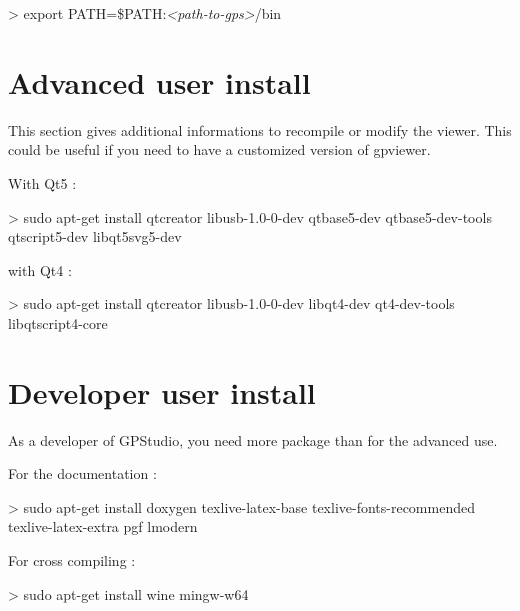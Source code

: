 \documentclass[10pt,a4paper]{article}
\begin{document}
\begin{sample}
> export PATH=\$PATH:\emph{<path-to-gps>}/bin
\end{sample}

\section{Advanced user install}
This section gives additional informations to recompile or modify the viewer. This could be useful if you need to have a customized version of gpviewer.

With Qt5 :
\begin{sample}
> sudo apt-get install qtcreator libusb-1.0-0-dev qtbase5-dev qtbase5-dev-tools qtscript5-dev libqt5svg5-dev
\end{sample}

with Qt4 :
\begin{sample}
> sudo apt-get install qtcreator libusb-1.0-0-dev libqt4-dev qt4-dev-tools libqtscript4-core
\end{sample}

\section{Developer user install}
As a developer of GPStudio, you need more package than for the advanced use.

For the documentation :
\begin{sample}
> sudo apt-get install doxygen texlive-latex-base texlive-fonts-recommended texlive-latex-extra pgf lmodern
\end{sample}

For cross compiling :
\begin{sample}
> sudo apt-get install wine mingw-w64
\end{sample}
\end{document}
